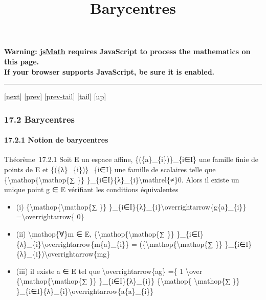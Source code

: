 \documentclass[]{article}
\title{Barycentres}
\author{}
\date{}
\begin{document}
\maketitle

\textbf{Warning: \href{http://www.math.union.edu/locate/jsMath}{jsMath}
requires JavaScript to process the mathematics on this page.\\ If your
browser supports JavaScript, be sure it is enabled.}

\begin{center}\rule{3in}{0.4pt}\end{center}

{[}\href{coursse94.html}{next}{]} {[}\href{coursse92.html}{prev}{]}
{[}\href{coursse92.html\#tailcoursse92.html}{prev-tail}{]}
{[}\hyperref[tailcoursse93.html]{tail}{]}
{[}\href{coursch18.html\#coursse93.html}{up}{]}

\subsubsection{17.2 Barycentres}

\paragraph{17.2.1 Notion de barycentres}

Théorème~17.2.1 Soit E un espace affine, \{(\{a\}\_\{i\})\}\_\{i∈I\} une
famille finie de points de E et \{(\{λ\}\_\{i\})\}\_\{i∈I\} une famille
de scalaires telle que
\{\textbackslash{}mathop\{\textbackslash{}mathop\{∑ \}\}
\}\_\{i∈I\}\{λ\}\_\{i\}\textbackslash{}mathrel\{≠\}0. Alors il existe un
unique point g ∈ E vérifiant les conditions équivalentes

\begin{itemize}
\itemsep1pt\parskip0pt
\item
  (i) \{\textbackslash{}mathop\{\textbackslash{}mathop\{∑ \}\}
  \}\_\{i∈I\}\{λ\}\_\{i\}\textbackslash{}overrightarrow\{g\{a\}\_\{i\}\}
  =\textbackslash{}overrightarrow\{ 0\}
\item
  (ii) \textbackslash{}mathop\{∀\}m ∈ E,
  \{\textbackslash{}mathop\{\textbackslash{}mathop\{∑ \}\}
  \}\_\{i∈I\}\{λ\}\_\{i\}\textbackslash{}overrightarrow\{m\{a\}\_\{i\}\}
  = (\{\textbackslash{}mathop\{\textbackslash{}mathop\{∑ \}\}
  \}\_\{i∈I\}\{λ\}\_\{i\})\textbackslash{}overrightarrow\{mg\}
\item
  (iii) il existe a ∈ E tel que \textbackslash{}overrightarrow\{ag\} =\{
  1 \textbackslash{}over
  \{\textbackslash{}mathop\{\textbackslash{}mathop\{∑ \}\}
  \}\_\{i∈I\}\{λ\}\_\{i\}\} \{\textbackslash{}mathop\{
  \textbackslash{}mathop\{∑ \}\}
  \}\_\{i∈I\}\{λ\}\_\{i\}\textbackslash{}overrightarrow\{a\{a\}\_\{i\}\}
\end{itemize}
\end{document}
